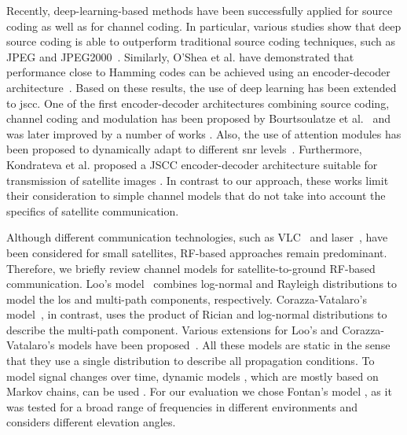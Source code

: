 \documentclass[conference]{IEEEtran}
\begin{document}
Recently, deep-learning-based methods have been successfully applied for source coding as well as for channel coding. In particular, various studies show that deep source coding is able to outperform traditional source coding techniques, such as JPEG and JPEG2000~\cite{toderici2016variable, ballé2017endtoend, Hu2022}.
Similarly, O'Shea et al. have demonstrated that performance close to Hamming codes can be achieved using an encoder-decoder architecture~\cite{8054694}. 
Based on these results, the use of deep learning has been extended to \ac{jscc}.
One of the first encoder-decoder architectures combining source coding, channel coding and modulation has been proposed by Bourtsoulatze et al.~\cite{Bourtsoulatze2019} and was later improved by a number of works \cite{Xuan2021,Kurka2021,yang2021_2}.
Also, the use of attention modules has been proposed to dynamically adapt to different \ac{snr} levels~\cite{9438648}. 
Furthermore, Kondrateva et al. proposed a JSCC encoder-decoder architecture suitable for transmission of satellite images \cite{satjscc}.
In contrast to our approach, these works limit their consideration to simple channel models that do not take into account the specifics of satellite communication.

Although different communication technologies, such as VLC~\cite{nakajima2012} and laser~\cite{welle2018}, have been considered for small satellites, RF-based approaches remain predominant.
Therefore, we briefly review channel models for satellite-to-ground RF-based communication.   
Loo's model~\cite{1623307} combines log-normal and Rayleigh distributions to model the \ac{los} and multi-path components, respectively.
Corazza-Vatalaro's model~\cite{Corazza1994ASM}, in contrast, uses the product of Rician and log-normal distributions to describe the multi-path component. 
Various extensions for Loo's and Corazza-Vatalaro's models have been proposed~\cite{596315, 661055}.
All these models are static in the sense that they use a single distribution to describe all propagation conditions.
To model signal changes over time, dynamic models \cite{966585,4151152,7779114,8693582}, which are mostly based on Markov chains, can be used \cite{9079470}.
For our evaluation we chose Fontan's model \cite{966585}, as it was tested for a broad range of frequencies in different environments and considers different elevation angles.
\end{document}
